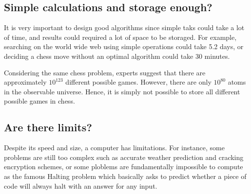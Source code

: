 \documentclass[a4paper]{article}
\begin{document}
\subsection{Simple calculations and storage enough?}

It is very important to design good algorithms since simple taks could take
a lot of time, and results could required a lot of space to be storaged.
For example, searching on the world wide web using simple operations could take
5.2 days, or deciding a chess move without an optimal algorithm could take 30
minutes.

Considering the same chess problem, experts suggest that there are
approximately $10^{123}$ different possible games. However, there are only
$10^{80}$ atoms in the observable universe. Hence, it is simply not
possible to store all different possible games in chess.

\subsection{Are there limits?}

Despite its speed and size, a computer has limitations. For instance, some
problems are still too complex such as accurate weather prediction and
cracking encryption schemes, or some ploblems are fundamentally impossible to
compute as the famous Halting problem which basically asks to predict whether
a piece of code will always halt with an answer for any input.
\end{document}
